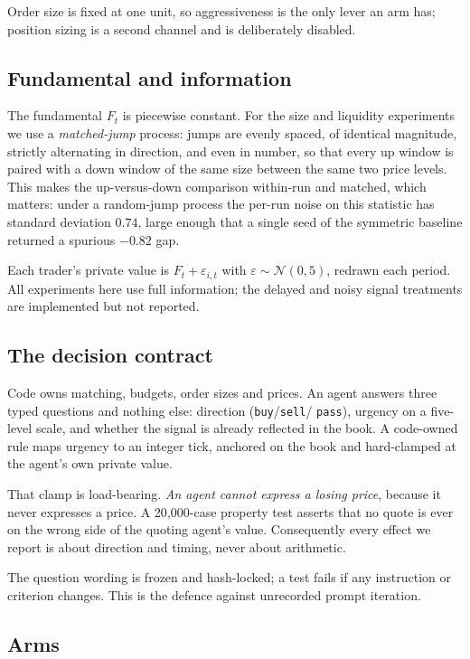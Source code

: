 \documentclass[11pt]{article}
\begin{document}
Order size is fixed at one unit, so aggressiveness is the only lever an arm
has; position sizing is a second channel and is deliberately disabled.

\subsection{Fundamental and information}

The fundamental $F_t$ is piecewise constant. For the size and liquidity
experiments we use a \emph{matched-jump} process: jumps are evenly spaced, of
identical magnitude, strictly alternating in direction, and even in number, so
that every up window is paired with a down window of the same size between the
same two price levels. This makes the up-versus-down comparison within-run and
matched, which matters: under a random-jump process the per-run noise on this
statistic has standard deviation $0.74$, large enough that a single seed of the
symmetric baseline returned a spurious $-0.82$ gap.

Each trader's private value is $F_t + \varepsilon_{i,t}$ with
$\varepsilon \sim \mathcal{N}(0, 5)$, redrawn each period. All experiments here
use full information; the delayed and noisy signal treatments are implemented
but not reported.

\subsection{The decision contract}

Code owns matching, budgets, order sizes and prices. An agent answers three
typed questions and nothing else: direction (\texttt{buy}/\texttt{sell}/%
\texttt{pass}), urgency on a five-level scale, and whether the signal is
already reflected in the book. A code-owned rule maps urgency to an integer
tick, anchored on the book and hard-clamped at the agent's own private value.

That clamp is load-bearing. \emph{An agent cannot express a losing price},
because it never expresses a price. A 20{,}000-case property test asserts that
no quote is ever on the wrong side of the quoting agent's value. Consequently
every effect we report is about direction and timing, never about arithmetic.

The question wording is frozen and hash-locked; a test fails if any instruction
or criterion changes. This is the defence against unrecorded prompt iteration.

\subsection{Arms}
\end{document}
